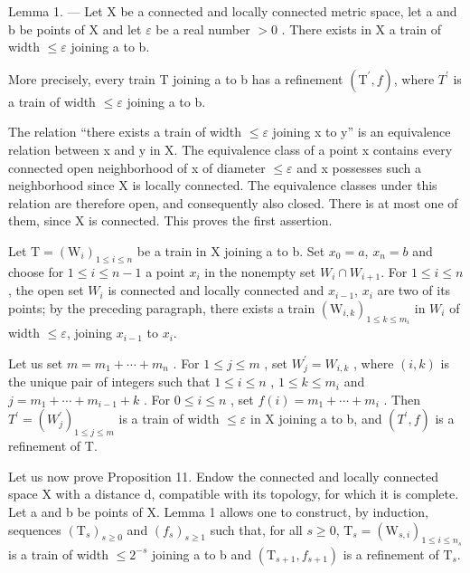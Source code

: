Lemma 1. --- Let X be a connected and locally connected metric space, let a and b be points of X and let \(\varepsilon\) be a real number \(>0\) . There exists in X a train of width \(\leqslant \varepsilon\) joining a to b.

More precisely, every train T joining a to b has a refinement \((\mathrm{T}^{\prime}, f)\), where \(T^{\prime}\) is a train of width \(\leqslant\varepsilon\) joining a to b.

The relation “there exists a train of width \(\leqslant\varepsilon\) joining x to y” is an equivalence relation between x and y in X. The equivalence class of a point x contains every connected open neighborhood of x of diameter \(\leqslant\varepsilon\) and x possesses such a neighborhood since X is locally connected. The equivalence classes under this relation are therefore open, and consequently also closed. There is at most one of them, since X is connected. This proves the first assertion.

Let \(\mathrm{T}=(\mathrm{W}_{i})_{1\leqslant i\leqslant n}\) be a train in X joining a to b. Set \(x_{0}=a\), \(x_{n}=b\) and choose for \(1\leqslant i\leqslant n-1\) a point \(x_{i}\) in the nonempty set \(W_{i}\cap W_{i+1}\). For \(1\leqslant i\leqslant n\), the open set \(W_{i}\) is connected and locally connected and \(x_{i-1}\), \(x_{i}\) are two of its points; by the preceding paragraph, there exists a train \((\mathrm{W}_{i,k})_{1\leqslant k\leqslant m_{i}}\) in \(W_{i}\) of width \(\leqslant\varepsilon\), joining \(x_{i-1}\) to \(x_{i}\).

Let us set \(m = m_{1} + \cdots + m_{n}\) . For \(1 \leqslant j \leqslant m\) , set \(W_{j}^{\prime} = W_{i,k}\) , where \((i, k)\) is the unique pair of integers such that \(1 \leqslant i \leqslant n\) , \(1 \leqslant k \leqslant m_{i}\) and \(j = m_{1} + \cdots + m_{i-1} + k\) . For \(0 \leqslant i \leqslant n\) , set \(f(i) = m_{1} + \cdots + m_{i}\) . Then \(T^{\prime} = (W_{j}^{\prime})_{1 \leqslant j \leqslant m}\) is a train of width \(\leqslant \varepsilon\) in X joining a to b, and \((T^{\prime}, f)\) is a refinement of T.

Let us now prove Proposition 11. Endow the connected and locally connected space X with a distance d, compatible with its topology, for which it is complete. Let a and b be points of X. Lemma 1 allows one to construct, by induction, sequences \((\mathrm{T}_s)_{s \geqslant 0}\) and \((f_s)_{s \geqslant 1}\) such that, for all \(s \geqslant 0\), \(\mathrm{T}_s = (\mathrm{W}_{s,i})_{1 \leqslant i \leqslant n_s}\) is a train of width \(\leqslant 2^{-s}\) joining a to b and \((\mathrm{T}_{s+1}, f_{s+1})\) is a refinement of \(\mathrm{T}_s\).

